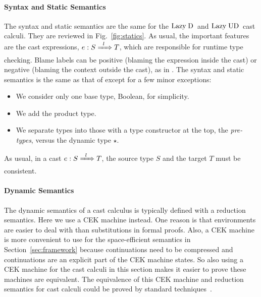 \documentclass[runningheads]{llncs}
\newcommand{\figref}[1]{Fig.~\ref{#1}}
\newcommand{\chapref}[1]{Section~\ref{#1}}
\newcommand{\LUD}{\ensuremath{\text{Lazy\;UD}}}
\newcommand{\LD}{\ensuremath{\text{Lazy\;D}}}
\newcommand{\Tdyn}[0]{\ensuremath{\star}}
\newcommand{\ecast}[2]{\ensuremath{#1 : #2}}
\newcommand{\ccast}[3]{#1 \xRightarrow[]{\enskip #2 \enskip} #3}
\begin{document}
\paragraph{Syntax and Static Semantics}

The syntax and static semantics are the same for the \LD\ and
\LUD\ cast calculi. They are reviewed in \figref{fig:statics}.
As usual, the important features are the cast expressions,
$\ecast{e}{\ccast{S}{l}{T}}$, which are responsible for runtime type
checking. Blame labels can be positive (blaming the expression inside the cast)
or negative (blaming the context outside the cast), as in \cite{wadler2009well}.
The syntax and static semantics is the same as that of 
\citep{siek2009exploring} except for a few minor exceptions:

\begin{itemize}
\item We consider only one base type, Boolean, for simplicity.
\item We add the product type.
\item We separate types into those with a type constructor at the top,
  the \emph{pre-types}, versus the dynamic type \Tdyn.
\end{itemize}
As usual, in a cast $\ecast{e}{\ccast{S}{l}{T}}$, the source type $S$
and the target $T$ must be consistent.

\paragraph{Dynamic Semantics}

The dynamic semantics of a cast calculus is typically defined with a
reduction semantics. Here we use a CEK machine
\citep{felleisen1986control} instead. One reason is that environments
are easier to deal with than substitutions in formal proofs. Also, a
CEK machine is more convenient to use for the space-efficient
semantics in \chapref{sec:framework} because continuations need to be
compressed and continuations are an explicit part of the CEK machine
states.  So also using a CEK machine for the cast calculi in this
section makes it easier to prove these machines are equivalent.  The
equivalence of this CEK machine and reduction semantics for cast
calculi could be proved by standard
techniques~\citep{Felleisen:2009aa}.
\end{document}
